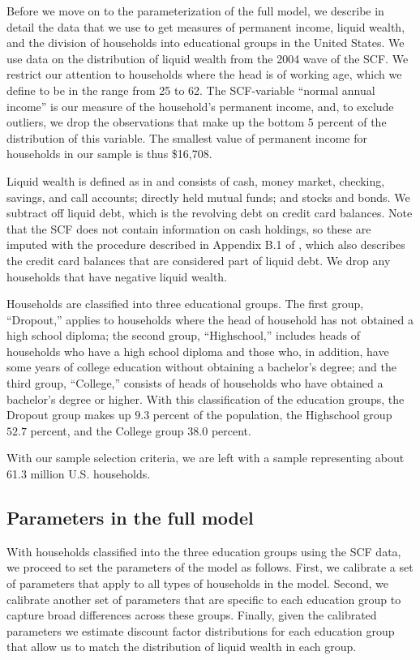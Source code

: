 \documentclass[\econtexRoot/HAFiscal]{subfiles}
\begin{document}
Before we move on to the parameterization of the full model, we describe in detail the data that we use to get measures of permanent income, liquid wealth, and the division of households into educational groups in the United States.
We use data on the distribution of liquid wealth from the 2004 wave of the SCF.
We restrict our attention to households where the head is of working age, which we define to be in the range from 25 to 62.
The SCF-variable ``normal annual income'' is our measure of the household's permanent income, and, to exclude outliers, we drop the observations that make up the bottom 5 percent of the distribution of this variable.
The smallest value of permanent income for households in our sample is thus \$16,708.


Liquid wealth is defined as in \cite{kaplan2014model} and consists of cash, money market, checking, savings, and call accounts; directly held mutual funds; and stocks and bonds.
We subtract off liquid debt, which is the revolving debt on credit card balances.
Note that the SCF does not contain information on cash holdings, so these are imputed with the procedure described in Appendix B.1 of \cite{kaplan2014model}, which also describes the credit card balances that are considered part of liquid debt.
We drop any households that have negative liquid wealth.


Households are classified into three educational groups.
The first group, ``Dropout,'' applies to households where the head of household has not obtained a high school diploma; the second group, ``Highschool,'' includes heads of households who have a high school diploma and those who, in addition, have some years of college education without obtaining a bachelor's degree; and the third group, ``College,'' consists of heads of households who have obtained a bachelor's degree or higher.
With this classification of the education groups, the Dropout group makes up $9.3$ percent of the population, the Highschool group $52.7$ percent, and the College group $38.0$ percent.


With our sample selection criteria, we are left with a sample representing about 61.3 million U.S.
households.

\subsection{Parameters in the full model}
\notinsubfile{\label{sec:paramsFull}}

With households classified into the three education groups using the SCF data, we proceed to set the parameters of the model as follows.
First, we calibrate a set of parameters that apply to all types of households in the model.
Second, we calibrate another set of parameters that are specific to each education group to capture broad differences across these groups.
Finally, given the calibrated parameters we estimate discount factor distributions for each education group that allow us to match the distribution of liquid wealth in each group.
\end{document}
